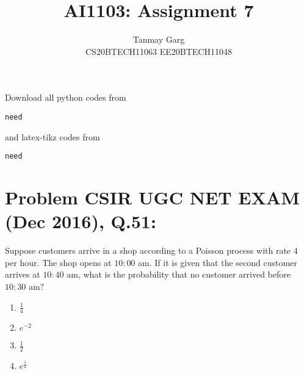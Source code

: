 \documentclass[journal,12pt,twocolumn]{IEEEtran}
\begin{document}
     \def\rightbox#1{\makebox[0in][r]{#1}}
     \def\centbox#1{\makebox[0in]{#1}}
     \def\topbox#1{\raisebox{-\baselineskip}[0in][0in]{#1}}
     \def\midbox#1{\raisebox{-0.5\baselineskip}[0in][0in]{#1}}
\vspace{3cm}
\title{AI1103: Assignment 7}
\author{Tanmay Garg \\CS20BTECH11063 EE20BTECH11048}
\maketitle
\newpage
\bigskip
\renewcommand{\thefigure}{\theenumi}
\renewcommand{\thetable}{\theenumi}
Download all python codes from 
\begin{lstlisting}
need
\end{lstlisting}
%
and latex-tikz codes from 
%
\begin{lstlisting}
need
\end{lstlisting}
\section*{Problem CSIR UGC NET EXAM (Dec 2016), Q.51: }
Suppose customers arrive in a shop according to a Poisson process with rate $4$ per hour. The shop opens at $10:00$ am. If it is given that the second customer arrives at $10:40 $ am, what is the probability that no customer arrived before $10:30 $ am? 
\begin{multicols}{4}
    \begin{enumerate}
        \item $\frac{1}{4}$
        \item $e^{-2}$
        \item $\frac{1}{2}$
        \item $e^{\frac{1}{2}}$
    \end{enumerate}
\end{multicols}
\end{document}
